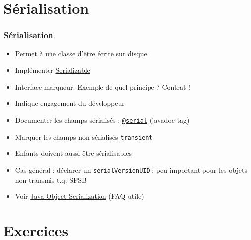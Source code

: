 \documentclass[english, french]{beamer}
\begin{document}
\section{Sérialisation}
\begin{frame}
	\frametitle{Sérialisation}
	\begin{itemize}
		\item Permet à une classe d’être écrite sur disque
		\item Implémenter \href{http://docs.oracle.com/javase/8/docs/api/java/io/Serializable.html}{Serializable}
		\item Interface marqueur. Exemple de quel principe ? \pause Contrat !
		\item Indique engagement du développeur \pause
		\item Documenter les champs sérialisés : \href{http://docs.oracle.com/javase/1.5.0/docs/tooldocs/windows/javadoc.html@serial}{\texttt{@serial}} (javadoc tag)
		\item Marquer les champs non-sérialisés \texttt{transient}
		\item Enfants doivent aussi être sérialisables
		\item {\tiny Cas général : déclarer un \texttt{serialVersionUID} ; peu important pour les objets non transmis t.q. SFSB}
		\item Voir \href{https://docs.oracle.com/javase/8/docs/technotes/guides/serialization/index.html}{Java Object Serialization} (FAQ utile)
	\end{itemize}
\end{frame}

\section{Exercices}
\end{document}

